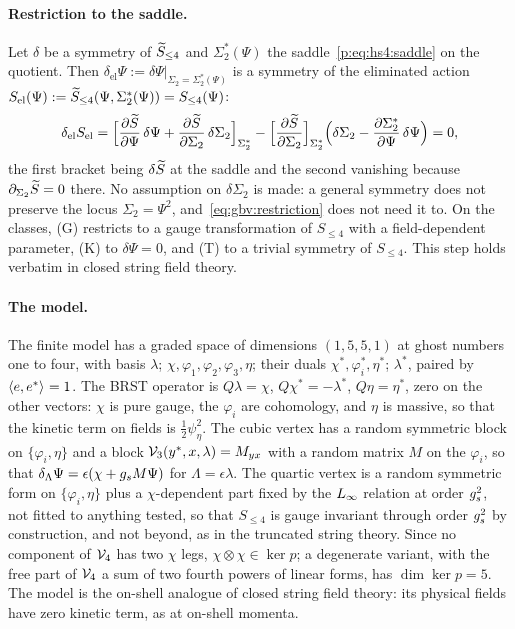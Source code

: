 \paragraph{Restriction to the saddle.}
Let $\delta$ be a symmetry of $\caction[\le 4]$ and $\Sigma_2^*(\Psi)$ the saddle~\eqref{p:eq:hs4:saddle} on the quotient.
Then $\delta_{\mathrm{el}} \Psi := \delta \Psi |_{\Sigma_2 = \Sigma_2^*(\Psi)}$ is a symmetry of the eliminated action $S_{\mathrm{el}}(\Psi) := \caction[\le 4](\Psi, \Sigma_2^*(\Psi)) = S_{\le 4}(\Psi)$:
\begin{equation}
  \label{eq:gbv:restriction}
  \delta_{\mathrm{el}} S_{\mathrm{el}}
    = \Big[ \frac{\partial \caction}{\partial \Psi} \, \delta \Psi
      + \frac{\partial \caction}{\partial \Sigma_2} \, \delta \Sigma_2 \Big]_{\Sigma_2^*}
      - \Big[ \frac{\partial \caction}{\partial \Sigma_2} \Big]_{\Sigma_2^*} \Big( \delta \Sigma_2 - \frac{\partial \Sigma_2^*}{\partial \Psi} \, \delta \Psi \Big)
    = 0,
\end{equation}
the first bracket being $\delta \caction$ at the saddle and the second vanishing because $\partial_{\Sigma_2} \caction = 0$ there.
No assumption on $\delta \Sigma_2$ is made: a general symmetry does not preserve the locus $\Sigma_2 = \Psi^2$, and~\eqref{eq:gbv:restriction} does not need it to.
On the classes, (G) restricts to a gauge transformation of $S_{\le 4}$ with a field-dependent parameter, (K) to $\delta \Psi = 0$, and (T) to a trivial symmetry of $S_{\le 4}$.
This step holds verbatim in closed string field theory.

\paragraph{The model.}
The finite model has a graded space of dimensions $(1, 5, 5, 1)$ at ghost numbers one to four, with basis $\lambda$; $\chi, \varphi_1, \varphi_2, \varphi_3, \eta$; their duals $\chi^*, \varphi_i^*, \eta^*$; $\lambda^*$, paired by $\pair{e}{e^*} = 1$.
The BRST operator is $Q \lambda = \chi$, $Q \chi^* = - \lambda^*$, $Q \eta = \eta^*$, zero on the other vectors: $\chi$ is pure gauge, the $\varphi_i$ are cohomology, and $\eta$ is massive, so that the kinetic term on fields is $\tfrac12 \psi_\eta^2$.
The cubic vertex has a random symmetric block on $\{ \varphi_i, \eta \}$ and a block $\vertex{3}(y^*, x, \lambda) = M_{y x}$ with a random matrix $M$ on the $\varphi_i$, so that $\delta_\Lambda \Psi = \epsilon (\chi + \gs M \Psi)$ for $\Lambda = \epsilon \lambda$.
The quartic vertex is a random symmetric form on $\{ \varphi_i, \eta \}$ plus a $\chi$-dependent part fixed by the $\Loo$ relation at order $\gs^2$, not fitted to anything tested, so that $S_{\le 4}$ is gauge invariant through order $\gs^2$ by construction, and not beyond, as in the truncated string theory.
Since no component of $\vertex{4}$ has two $\chi$ legs, $\chi \otimes \chi \in \ker p$; a degenerate variant, with the free part of $\vertex{4}$ a sum of two fourth powers of linear forms, has $\dim \ker p = 5$.
The model is the on-shell analogue of closed string field theory: its physical fields have zero kinetic term, as at on-shell momenta.

